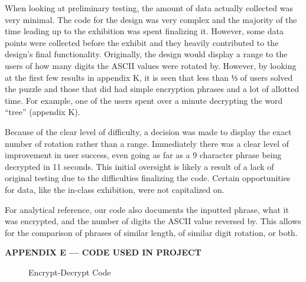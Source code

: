 \documentclass[conference]{IEEEtran}
\begin{document}
\par When looking at preliminary testing, the amount of data actually collected was very minimal. The code for the design was very complex and the majority of the time leading up to the exhibition was spent finalizing it. However, some data points were collected before the exhibit and they heavily contributed to the design’s final functionality. Originally, the design would display a range to the users of how many digits the ASCII values were rotated by. However, by looking at the first few results in appendix K, it is seen that less than ⅓ of users solved the puzzle and those that did had simple encryption phrases and a lot of allotted time. For example, one of the users spent over a minute decrypting the word “tree” (appendix K). 
\par Because of the clear level of difficulty, a decision was made to display the exact number of rotation rather than a range. Immediately there was a clear level of improvement in user success, even going as far as a 9 character phrase being decrypted in 11 seconds. This initial oversight is likely a result of a lack of original testing due to the difficulties finalizing the code. Certain opportunities for data, like the in-class exhibition, were not capitalized on. 
\par For analytical reference, our code also documents the inputted phrase, what it was encrypted, and the number of digits the ASCII value reversed by. This allows for the comparison of phrases of similar length, of similar digit rotation, or both. 

 \newpage


 \hspace{.5in}   \textbf{APPENDIX E — CODE USED IN PROJECT}  

\begin{figure}[h!]
  \caption{Encrypt-Decrypt Code}
\end{figure}
\vspace{-15pt}

\end{document}
